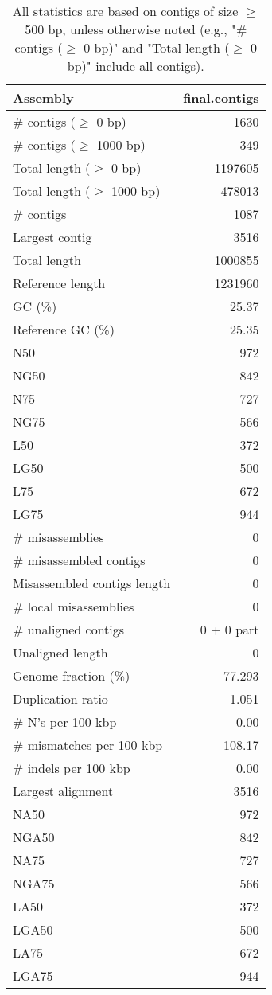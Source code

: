 \documentclass[12pt,a4paper]{article}
\begin{document}
\begin{table}[ht]
\begin{center}
\caption{All statistics are based on contigs of size $\geq$ 500 bp, unless otherwise noted (e.g., "\# contigs ($\geq$ 0 bp)" and "Total length ($\geq$ 0 bp)" include all contigs).}
\begin{tabular}{|l*{1}{|r}|}
\hline
Assembly & final.contigs \\ \hline
\# contigs ($\geq$ 0 bp) & 1630 \\ \hline
\# contigs ($\geq$ 1000 bp) & 349 \\ \hline
Total length ($\geq$ 0 bp) & 1197605 \\ \hline
Total length ($\geq$ 1000 bp) & 478013 \\ \hline
\# contigs & 1087 \\ \hline
Largest contig & 3516 \\ \hline
Total length & 1000855 \\ \hline
Reference length & 1231960 \\ \hline
GC (\%) & 25.37 \\ \hline
Reference GC (\%) & 25.35 \\ \hline
N50 & 972 \\ \hline
NG50 & 842 \\ \hline
N75 & 727 \\ \hline
NG75 & 566 \\ \hline
L50 & 372 \\ \hline
LG50 & 500 \\ \hline
L75 & 672 \\ \hline
LG75 & 944 \\ \hline
\# misassemblies & 0 \\ \hline
\# misassembled contigs & 0 \\ \hline
Misassembled contigs length & 0 \\ \hline
\# local misassemblies & 0 \\ \hline
\# unaligned contigs & 0 + 0 part \\ \hline
Unaligned length & 0 \\ \hline
Genome fraction (\%) & 77.293 \\ \hline
Duplication ratio & 1.051 \\ \hline
\# N's per 100 kbp & 0.00 \\ \hline
\# mismatches per 100 kbp & 108.17 \\ \hline
\# indels per 100 kbp & 0.00 \\ \hline
Largest alignment & 3516 \\ \hline
NA50 & 972 \\ \hline
NGA50 & 842 \\ \hline
NA75 & 727 \\ \hline
NGA75 & 566 \\ \hline
LA50 & 372 \\ \hline
LGA50 & 500 \\ \hline
LA75 & 672 \\ \hline
LGA75 & 944 \\ \hline
\end{tabular}
\end{center}
\end{table}
\end{document}
